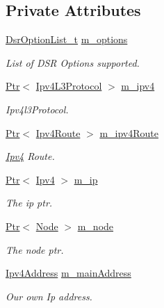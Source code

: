\subsection*{Private Attributes}
\begin{DoxyCompactItemize}
\item 
\hyperlink{classns3_1_1dsr_1_1DsrRouting_a44a611adccbcf5776103154d0d2341d1}{Dsr\+Option\+List\+\_\+t} \hyperlink{classns3_1_1dsr_1_1DsrRouting_a7f705d6856c04b7bce60317db968bf45}{m\+\_\+options}
\begin{DoxyCompactList}\small\item\em List of D\+SR Options supported. \end{DoxyCompactList}\item 
\hyperlink{classns3_1_1Ptr}{Ptr}$<$ \hyperlink{classns3_1_1Ipv4L3Protocol}{Ipv4\+L3\+Protocol} $>$ \hyperlink{classns3_1_1dsr_1_1DsrRouting_aa42c1b9ee27c8168a2141d3d032006c3}{m\+\_\+ipv4}
\begin{DoxyCompactList}\small\item\em Ipv4l3\+Protocol. \end{DoxyCompactList}\item 
\hyperlink{classns3_1_1Ptr}{Ptr}$<$ \hyperlink{classns3_1_1Ipv4Route}{Ipv4\+Route} $>$ \hyperlink{classns3_1_1dsr_1_1DsrRouting_ab4c16d56044159989e52ad33c0afed2b}{m\+\_\+ipv4\+Route}
\begin{DoxyCompactList}\small\item\em \hyperlink{classns3_1_1Ipv4}{Ipv4} Route. \end{DoxyCompactList}\item 
\hyperlink{classns3_1_1Ptr}{Ptr}$<$ \hyperlink{classns3_1_1Ipv4}{Ipv4} $>$ \hyperlink{classns3_1_1dsr_1_1DsrRouting_a0443d48172143cafa1d0491e35f3fbaf}{m\+\_\+ip}
\begin{DoxyCompactList}\small\item\em The ip ptr. \end{DoxyCompactList}\item 
\hyperlink{classns3_1_1Ptr}{Ptr}$<$ \hyperlink{classns3_1_1Node}{Node} $>$ \hyperlink{classns3_1_1dsr_1_1DsrRouting_ac27df0103a40973f0a3f78af0092c60d}{m\+\_\+node}
\begin{DoxyCompactList}\small\item\em The node ptr. \end{DoxyCompactList}\item 
\hyperlink{classns3_1_1Ipv4Address}{Ipv4\+Address} \hyperlink{classns3_1_1dsr_1_1DsrRouting_a73182b5edee2d8460f28855e058fc9a0}{m\+\_\+main\+Address}
\begin{DoxyCompactList}\small\item\em Our own Ip address. \end{DoxyCompactList}\item 

\end{DoxyCompactItemize}
